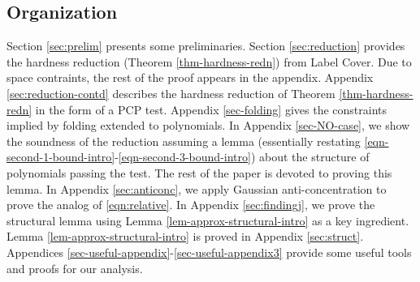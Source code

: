 
\subsection{Organization} \label{sec:organization-full}
Section \ref{sec:prelim} presents some preliminaries. Section \ref{sec:reduction} provides the hardness reduction (Theorem \ref{thm-hardness-redn})
from Label Cover. Due to space contraints, the rest of the proof appears in the appendix. Appendix \ref{sec:reduction-contd}
describes
the hardness reduction of Theorem \ref{thm-hardness-redn} in the form of a PCP test. Appendix \ref{sec-folding} gives the 
constraints implied by folding extended to polynomials. 
 In Appendix \ref{sec-NO-case}, we show the soundness
of the reduction assuming a lemma (essentially restating \eqref{eqn-second-1-bound-intro}-\eqref{eqn-second-3-bound-intro}) 
about the structure of polynomials passing the test. The rest of the paper is
devoted to proving this lemma. In Appendix \ref{sec:anticonc}, we apply Gaussian anti-concentration to prove the analog 
of \eqref{eqn:relative}.
In Appendix \ref{sec:findingj}, we prove the structural lemma using Lemma \ref{lem-approx-structural-intro} as a key ingredient. Lemma 
\ref{lem-approx-structural-intro} is proved in Appendix \ref{sec:struct}. Appendices \ref{sec-useful-appendix}-\ref{sec-useful-appendix3} provide some useful tools and proofs for our analysis.


